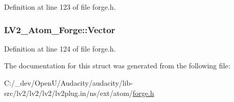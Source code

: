 Definition at line 123 of file forge.\+h.

\subsubsection[{\texorpdfstring{Vector}{Vector}}]{ L\+V2\+\_\+\+Atom\+\_\+\+Forge\+::\+Vector}\hypertarget{struct_l_v2___atom___forge_a27f8ab6881b64f049207749c72910588}{}\label{struct_l_v2___atom___forge_a27f8ab6881b64f049207749c72910588}


Definition at line 124 of file forge.\+h.



The documentation for this struct was generated from the following file\+:\begin{DoxyCompactItemize}
\item 
C\+:/\+\_\+dev/\+Open\+U/\+Audacity/audacity/lib-\/src/lv2/lv2/lv2/lv2plug.\+in/ns/ext/atom/\hyperlink{forge_8h}{forge.\+h}\end{DoxyCompactItemize}
